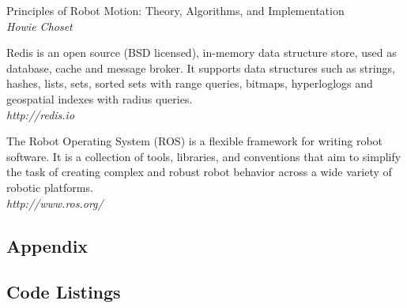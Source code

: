 \documentclass[11pt, a4paper]{article}
\begin{document}
\begin{thebibliography}{2}

\par{Principles of Robot Motion: Theory, Algorithms, and Implementation}\\
\textit{Howie Choset}

\par{Redis is an open source (BSD licensed), in-memory data structure store, used as database, cache and message broker. It supports data structures such as strings, hashes, lists, sets, sorted sets with range queries, bitmaps, hyperloglogs and geospatial indexes with radius queries.}\\
\textit{http://redis.io}

\par{The Robot Operating System (ROS) is a flexible framework for writing robot software. It is a collection of tools, libraries, and conventions that aim to simplify the task of creating complex and robust robot behavior across a wide variety of robotic platforms.}\\
\textit{http://www.ros.org/}

\end{thebibliography}


\begin{appendices}
\section*{Appendix}
\subsection{Code Listings}









\end{appendices}
\end{document}
